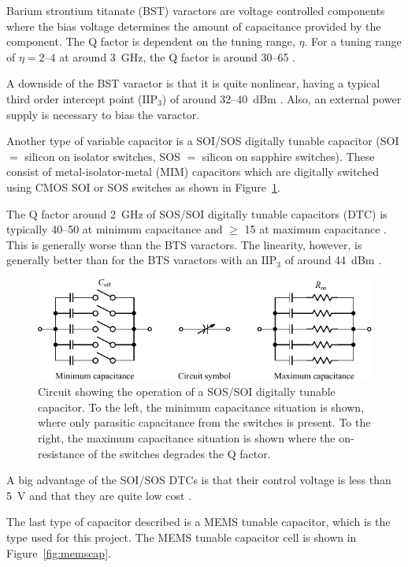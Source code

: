 Barium strontium titanate (BST) varactors are voltage controlled components where the bias voltage determines the amount of capacitance provided by the component. The Q factor is dependent on the tuning range, $\eta$. For a tuning range of $\eta = 2$--$4$ at around \SI{3}{GHz}, the Q factor is around 30--65 \cite{gu2014rf}. 

A downside of the BST varactor is that it is quite nonlinear, having a typical third order intercept point ($\text{IIP}_3$) of around 32--\SI{40}{dBm} \cite{gu2014rf}. Also, an external power supply is necessary to bias the varactor.

Another type of variable capacitor is a SOI/SOS digitally tunable capacitor (SOI $=$ silicon on isolator switches, SOS $=$ silicon on sapphire switches). These consist of metal-isolator-metal (MIM) capacitors which are digitally switched using CMOS SOI or SOS switches as shown in Figure~\ref{fig:sossoiswitch}. 

The Q factor around \SI{2}{GHz} of SOS/SOI digitally tunable capacitors (DTC) is typically 40--50 at minimum capacitance and $\geq$ 15 at maximum capacitance \cite{gu2014rf}. This is generally worse than the BTS varactors. The linearity, however, is generally better than for the BTS varactors with an $\text{IIP}_3$ of around \SI{44}{dBm} \cite{gu2014rf}.

\begin{figure}[htbp]
    \centering
    \includegraphics{img/analysis/sossoi_dtc}
    \caption{Circuit showing the operation of a SOS/SOI digitally tunable capacitor. To the left, the minimum capacitance situation is shown, where only parasitic capacitance from the switches is present. To the right, the maximum capacitance situation is shown where the on-resistance of the switches degrades the Q factor.}
    \label{fig:sossoiswitch}
\end{figure}

A big advantage of the SOI/SOS DTCs is that their control voltage is less than \SI{5}{V} and that they are quite low cost \cite{gu2014rf}.

The last type of capacitor described is a MEMS tunable capacitor, which is the type used for this project. The MEMS tunable capacitor cell is shown in Figure~\ref{fig:memscap}.

